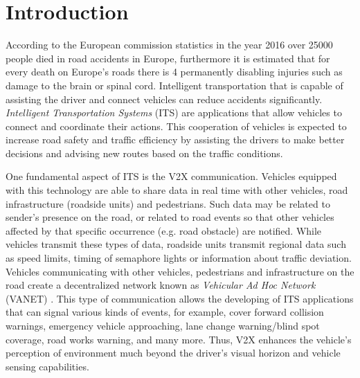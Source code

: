 
\chapter{Introduction}
\label{prob}

According to the European commission statistics \cite{death_road} in the year 2016 over 25000 people died in road accidents in Europe, furthermore it is estimated that for every death on Europe's roads there is 4 permanently disabling injuries such as damage to the brain or spinal cord. Intelligent transportation that is capable of assisting the driver and connect vehicles can reduce accidents significantly. \textit{Intelligent Transportation Systems} (ITS) \cite{its} are applications that allow vehicles to connect and coordinate their actions. This cooperation of vehicles is expected to increase road safety and traffic efficiency by assisting the drivers to make better decisions and advising new routes based on the traffic conditions.  

One fundamental aspect of ITS is the V2X communication. Vehicles equipped with this technology are able to share data in real time with other vehicles, road infrastructure (roadside units) and pedestrians. Such data may be related to sender's presence on the road, or related to road events so that other vehicles affected by that specific occurrence (e.g. road obstacle) are notified. While vehicles transmit these types of data, roadside units transmit regional data such as speed limits, timing of semaphore lights or information about traffic deviation. Vehicles communicating with other vehicles, pedestrians and infrastructure on the road create a decentralized network known as \textit{Vehicular Ad Hoc Network} (VANET) \cite{vanet_ETSI} \cite{vanet_IEEE}. This type of communication allows the developing of ITS applications that can signal various kinds of events, for example, cover forward collision warnings, emergency vehicle approaching, lane change warning\slash blind spot coverage, road works warning, and many more. Thus, V2X enhances the vehicle's perception of environment much beyond the driver's visual horizon and vehicle sensing capabilities.

